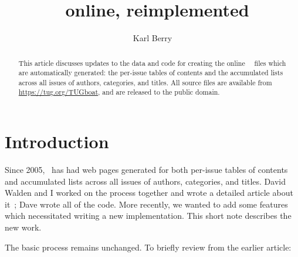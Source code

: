 \documentclass[final]{ltugboat}
\title{\TUB\ online, reimplemented}
\author{Karl Berry}
\begin{document}
\maketitle

\begin{abstract}
This article discusses updates to the data and code for creating the
online \TUB\ \HTML\ files which are automatically generated: the
per-issue tables of contents and the accumulated lists across all issues
of authors, categories, and titles. All source files are available from
\url{https://tug.org/TUGboat}, and are released to the public domain.
\end{abstract}

\section{Introduction}

Since 2005, \TUB\ has had web pages generated for both per-issue tables
of contents and accumulated lists across all issues of authors,
categories, and titles. David Walden and I worked on the process
together and wrote a detailed article about it~\cite{Berry:TB32-1-23};
Dave wrote all of the code. More recently, we wanted to add some
features which necessitated writing a new implementation. This short
note describes the new work.

The basic process remains unchanged. To briefly review from the earlier
article:
\end{document}
